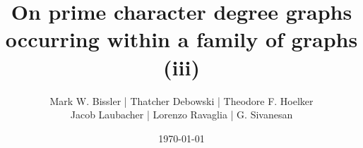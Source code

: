 \documentclass[11pt]{amsart}
\theoremstyle{definition}
\theoremstyle{remark}
\numberwithin{equation}{section}
\begin{document}
\allowdisplaybreaks


\title[Prime character degree graphs within a family (iii)]{On prime character degree graphs occurring within a family of graphs (iii)}


\author[Bissler et al.]{Mark W. Bissler  | Thatcher Debowski  | Theodore F. Hoelker \\ Jacob Laubacher  | Lorenzo Ravaglia  | G. Sivanesan }
\address{Mark W. Bissler  | Department of General Education, Western Governors University | Salt Lake City, Utah 84107, USA}
\email{\textcolor{magenta}{mark.bissler@wgu.edu}}


\address{Thatcher Debowski | Department of Mathematics, Hillsdale College | Hillsdale, Michigan 49242, USA}
\email{\textcolor{magenta}{tdebowski@hillsdale.edu}}


\address{Theodore F. Hoelker  | Department of Mathematics, Hillsdale College | Hillsdale, Michigan 49242, USA}
\email{\textcolor{magenta}{thoelker@hillsdale.edu}}


\address{Jacob Laubacher  | Department of Mathematics, Hillsdale College | Hillsdale, Michigan 49242, USA}
\email{\textcolor{magenta}{jlaubacher@hillsdale.edu}}


\address{Lorenzo Ravaglia  | Department of Mathematics, Hillsdale College | Hillsdale, Michigan 49242, USA}
\email{\textcolor{magenta}{lravaglia@hillsdale.edu}}


\address{G. Sivanesan  | Department of Mathematics, Government College of Engineering | Salem 636001, Tamil Nadu, India}
\email{\textcolor{magenta}{sivanesan@gceslem.edu.in}}


\date{\today}

\end{document}
